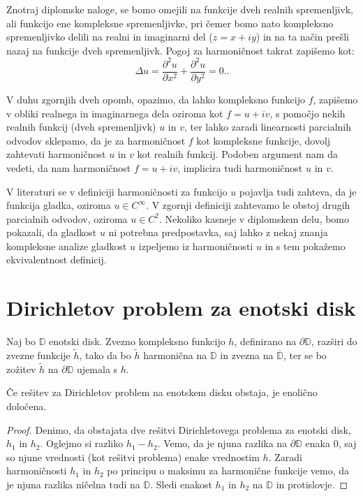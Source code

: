 \documentclass{article}
\begin{document}
    \begin{op}
        Znotraj diplomske naloge, se bomo omejili na funkcije dveh realnih spremenljivk, ali funkcijo ene kompleksne spremenljivke, pri čemer bomo nato kompleksno spremenljivko delili na realni in imaginarni del ($z = x + iy $) in na ta način prešli nazaj na funkcije dveh spremenljivk.
        \newline
        Pogoj za harmoničnost takrat zapišemo kot: 
            $$
                \Delta u = \frac{\partial^2 u}{\partial x ^ 2} +  \frac{\partial^2 u}{\partial y ^ 2}= 0..
            $$
    \end{op}
    V duhu zgornjih dveh opomb, opazimo, da lahko kompleksno funkcijo $f$, zapišemo v obliki realnega in imaginarnega dela oziroma kot $f = u + i v$, s pomočjo nekih realnih funkcij (dveh spremenljivk) $u$ in $v$, ter lahko zaradi linearnosti parcialnih odvodov sklepamo, da je za harmoničnost $f$ kot kompleksne funkcije, dovolj zahtevati harmoničnost $u$ in $v$ kot realnih funkcij.
    Podoben argument nam da vedeti, da nam harmoničnost $f = u + iv$, implicira tudi harmoničnost $u$ in $v$. 

    \begin{op}
        V literaturi se v definiciji harmoničnosti za funkcijo $u$ pojavlja tudi zahteva, da je funkcija gladka, oziroma $u \in C^{\infty}$. V zgornji definiciji zahtevamo le obstoj drugih parcialnih odvodov, oziroma $u \in C^2$. 
        Nekoliko kasneje v diplomskem delu, bomo pokazali, da gladkost $u$ ni potrebna predpostavka, saj lahko z nekaj znanja kompleksne analize gladkost $u$ izpeljemo iz harmoničnosti $u$ in s tem pokažemo ekvivalentnost definicij. 
    \end{op}


\section{Dirichletov problem za enotski disk}
    \begin{pro}
        Naj bo $\mathbb{D}$ enotski disk. Zvezno kompleksno funkcijo $h$, definirano na $\partial \mathbb{D}$, razširi do zvezne funkcije $\widetilde{h}$, tako da bo $\widetilde{h}$ harmonična na $\mathbb{D}$ in zvezna na $\overline{\mathbb{D}}$, ter se bo zožitev $\widetilde{h}$ na $\partial \mathbb{D}$ ujemala s $h$.
    \end{pro}

    \begin{lema}
        \label{enolicno}
        Če rešitev za Dirichletov problem na enotskem disku obstaja, je enolično določena.
    \end{lema}
    \begin{proof}
        Denimo, da obstajata dve rešitvi Dirichletovega problema za enotski disk, $h_1$ in $h_2$.
        Oglejmo si razliko $h_1 - h_2$. Vemo, da je njuna razlika na $\partial \mathbb{D}$ enaka $0$, saj so njune vrednosti (kot rešitvi problema) enake vrednostim $h$. 
        Zaradi harmoničnosti $h_1$ in $h_2$ po principu o maksimu za harmonične funkcije vemo, da je njuna razlika ničelna tudi na $\mathbb{D}$. Sledi enakost $h_1$ in $h_2$ na $\mathbb{D}$ in protislovje. 
    \end{proof}
\end{document}
